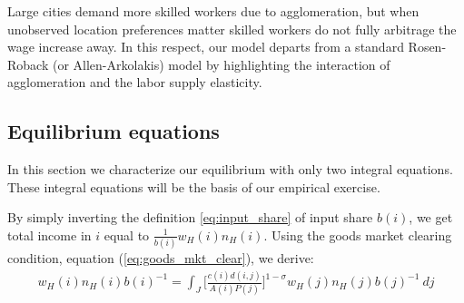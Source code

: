 \documentclass{article}
\begin{document}
Large cities demand more skilled workers due to agglomeration, but when unobserved location preferences matter skilled workers do not fully arbitrage the wage increase away. In this respect, our model departs from a standard Rosen-Roback (or Allen-Arkolakis) model by highlighting the interaction of agglomeration and the labor supply elasticity. 


\subsection{Equilibrium equations}

In this section we characterize our equilibrium with only two integral equations.  These integral equations will be the basis of our empirical exercise.  

By simply inverting the definition \eqref{eq:input_share} of input share $b(i)$, we get total income in $i$ equal to $\frac{1}{b(i)} w_H(i)n_H(i)$. Using the goods market clearing condition, equation (\ref{eq:goods_mkt_clear}), we derive: 
\begin{eqnarray}
	w_H(i) n_H(i) b(i)^{-1} = 
	\int_J \Big[ \frac{c(i) d(i,j)}{A(i) P(j)} \Big]^{1-\sigma} w_H(j) n_H(j) b(j)^{-1} ~dj \nonumber
\end{eqnarray}
\end{document}
